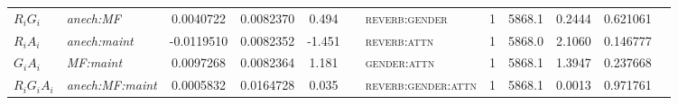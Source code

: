 \begin{table}
\begin{tabular}{ l >{\itshape}l S S S[round-precision=2] c >{\scshape}l c S[round-precision=1,table-format=4.1] S[round-precision=2] S[round-minimum=0.001,table-format=>1.3] c }
	$R_i G_i$         & anech:MF         &   0.0040722                  & 0.0082370              &  0.494                  & & reverb:gender      & 1   & 5868.1                  &  0.2444                 &  0.621061               &         \\
	$R_i A_i$         & anech:maint      &  -0.0119510                  & 0.0082352              & -1.451                  & & reverb:attn        & 1   & 5868.0                  &  2.1060                 &  0.146777               &         \\
	$G_i A_i$         & MF:maint         &   0.0097268                  & 0.0082364              &  1.181                  & & gender:attn        & 1   & 5868.1                  &  1.3947                 &  0.237668               &         \\
	$R_i G_i A_i$     & anech:MF:maint   &   0.0005832                  & 0.0164728              &  0.035                  & & reverb:gender:attn & 1   & 5868.1                  &  0.0013                 &  0.971761               &         \\ \bottomrule
\end{tabular}
\end{table}
\cleardoublepage \eject \pdfpagewidth=8.5in \pdfpageheight=11in \restoregeometry \doublespacing
